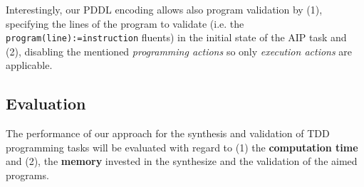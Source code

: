\documentclass[10pt,a4paper]{paper}
\begin{document}
Interestingly, our PDDL encoding allows also program validation by (1), specifying the lines of the program to validate (i.e. the {\tt program(line):=instruction} fluents) in the initial state of the AIP task and (2), disabling the mentioned {\it programming actions} so only {\it execution actions} are applicable.


\subsection{Evaluation}
\label{sec:evaluation}

The performance of our approach for the synthesis and validation of TDD programming tasks will be evaluated with regard to (1) the {\bf computation time} and (2), the {\bf memory} invested in the synthesize and the validation of the aimed programs.
\end{document}
